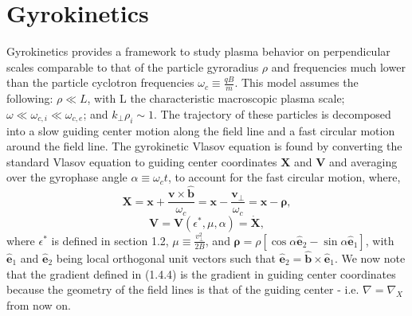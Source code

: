 \documentclass[12pt]{article}
\numberwithin{equation}{subsection}
\begin{document}
\section{Gyrokinetics}
   \quad Gyrokinetics provides a framework to study plasma behavior on perpendicular scales comparable to that of the
particle gyroradius $\rho$ and frequencies much lower than the particle cyclotron frequencies $\omega_c \equiv \frac{qB}{m}$. This model assumes
the following: $\rho \ll L$, with L the characteristic macroscopic plasma scale; $\omega \ll \omega_{c,i} \ll \omega_{c,e}$;
and $k_\perp \rho_i \sim 1$\cite{GyroKinAstr}. The trajectory of these particles is decomposed into a slow guiding center motion
along the field line and a fast circular motion around the field line. The gyrokinetic Vlasov equation is found by converting the
standard Vlasov equation to guiding center coordinates $\bm{X}$ and $\bm{V}$ and averaging over the gyrophase angle $\alpha
\equiv \omega_c t$, to account for the fast circular motion, where\cite{FriemanChen},
   \begin{equation}
      \bm{X} = \bm{x} + \frac{\bm{v}\times\bm{\hat{b}}}{\omega_c} = \bm{x} - \frac{\bm{v}_\perp}{\omega_c}
             = \bm{x} - \bm{\rho},
   \end{equation}
   \begin{equation}
      \bm{V} = \bm{V}(\epsilon^*, \mu, \alpha) = \dot{\bm{X}},
   \end{equation}
where $\epsilon^*$ is defined in section 1.2, $\mu \equiv \frac{v_\perp^2}{2B}$, and $\bm{\rho} =
\rho[\cos\alpha\bm{\hat{e}}_2 - \sin\alpha\bm{\hat{e}}_1]$, with $\bm{\hat{e}}_1$ and $\bm{\hat{e}}_2$
being local orthogonal unit vectors such that $\bm{\hat{e}}_2=\bm{\hat{b}}\times\bm{\hat{e}}_1$.
We now note that the gradient defined in (1.4.4) is the gradient in guiding center coordinates because
the geometry of the field lines is that of the guiding center - i.e. $\nabla = \nabla_X$ from now on.
\end{document}
